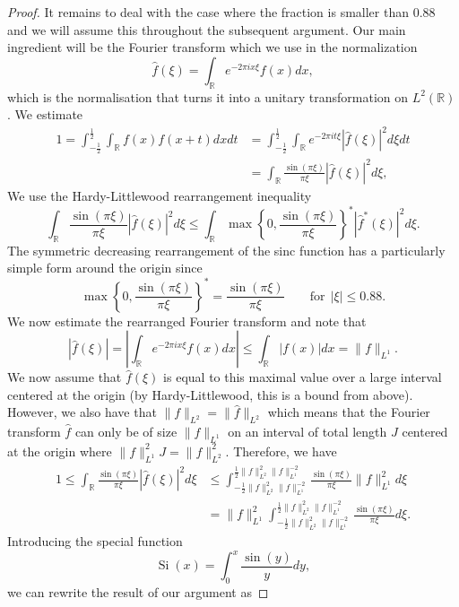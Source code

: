\documentclass{amsart}
\theoremstyle{remark}
\DeclareMathOperator{\Si}{Si}
\begin{document}
{\begin{proof}
 It remains to deal with the case where the fraction is smaller than 0.88 and we
will assume this throughout the subsequent argument.
Our main ingredient will be the Fourier transform which we use in the normalization
$$\widehat{f}(\xi) = \int_{\mathbb{R}}{ e^{-2 \pi i x \xi} f(x) dx},$$
which is the normalisation that turns it into a unitary transformation on $L^2(\mathbb{R})$. We estimate
\begin{align*}
1 = \int_{-\frac{1}{2}}^{\frac{1}{2}} \int_{\mathbb{R}}{f(x) f(x+t) dx} dt &= \int_{-\frac{1}{2}}^{\frac{1}{2}} \int_{\mathbb{R}}{ e^{-2 \pi i t \xi} |\widehat{f}(\xi)|^2 d\xi} dt\\
&=\int_{\mathbb{R}}^{}{ \frac{\sin{(\pi \xi)}}{\pi \xi}  |\widehat{f}(\xi)|^2 d\xi},
\end{align*}
We use the Hardy-Littlewood rearrangement inequality
$$ \int_{\mathbb{R}}^{}{ \frac{\sin{(\pi \xi)}}{\pi \xi}  |\widehat{f}(\xi)|^2 d\xi} \leq \int_{\mathbb{R}}^{}{ \max\left\{0,\frac{\sin{(\pi \xi)}}{\pi \xi}\right\}^* |\widehat{f}^*(\xi)|^2 d\xi}.$$
The symmetric decreasing rearrangement of the sinc function has a particularly simple form around the origin since
$$  \max\left\{0,\frac{\sin{(\pi \xi)}}{\pi \xi}\right\}^* = \frac{\sin{(\pi \xi)}}{\pi \xi} \qquad \mbox{for}~~|\xi| \leq 0.88.$$
We now estimate the rearranged Fourier transform and note that
$$ |\widehat{f}(\xi)| =  \left|  \int_{\mathbb{R}}{ e^{-2 \pi i x \xi} f(x) dx} \right| \leq  \int_{\mathbb{R}}{ |f(x)| dx} = \|f\|_{L^1}.$$
We now assume that $\widehat{f}(\xi)$ is equal to this maximal value over a large interval centered at the origin (by Hardy-Littlewood, this is a bound from above). However, we also have that $\|f\|_{L^2} = \|\widehat{f}\|_{L^2}$ which means that the Fourier transform $\widehat{f}$ can only be of size $\|f\|_{L^1}$ on an interval of total length $J$ centered at the origin where $\|f\|_{L^1}^2 J = \|f\|_{L^2}^2$. Therefore, we have
\begin{align*}
1 \leq \int_{\mathbb{R}}^{}{ \frac{\sin{(\pi \xi)}}{\pi \xi}  |\widehat{f}(\xi)|^2 d\xi} &\leq \int_{-\frac{1}{2}\|f\|_{L^2}^2\|f\|_{L^1}^{-2}}^{\frac{1}{2}\|f\|_{L^2}^2\|f\|_{L^1}^{-2}}{  \frac{\sin{(\pi \xi)}}{\pi \xi} \|f\|_{L^1}^2 d\xi}\\
&=\|f\|_{L^1}^2  \int_{-\frac{1}{2}\|f\|_{L^2}^2\|f\|_{L^1}^{-2}}^{\frac{1}{2}\|f\|_{L^2}^2\|f\|_{L^1}^{-2}}{  \frac{\sin{(\pi \xi)}}{\pi \xi}d\xi}.
\end{align*}
Introducing the special function
$$ \Si(x) = \int_0^x \frac{\sin{(y)}}{y} dy,$$
we can rewrite the result of our argument as

\end{proof}}
\end{document}
